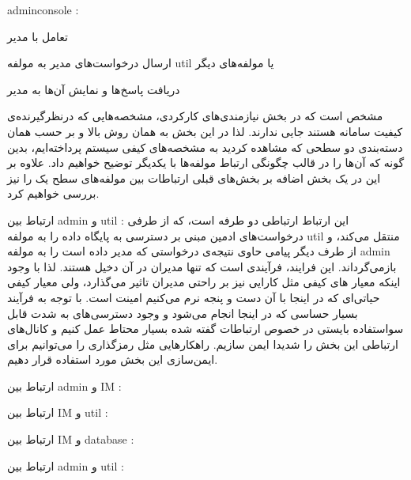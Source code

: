 \begin{itemize}	

	 adminconsole : 

	\begin{itemize}	

		 	تعامل با مدیر

			ارسال درخواست‌های مدیر به مولفه util	یا مولفه‌های دیگر

		  	دریافت پاسخ‌ها و نمایش آ‌ن‌ها به مدیر

		

	\end{itemize}

\end{itemize}	




مشخص است که در بخش نیازمندی‌های کارکردی، مشخصه‌هایی که درنظرگیرنده‌ی کیفیت سامانه هستند جایی ندارند. لذا در این بخش به همان روش بالا و بر حسب همان دسته‌بندی دو سطحی که مشاهده کردید به مشخصه‌های کیفی سیستم پرداخته‌ایم، بدین گونه که آن‌ها را در قالب چگونگی ارتباط مولفه‌ها با یکدیگر توضیح خواهیم داد. علاوه بر این در یک بخش اضافه بر بخش‌های قبلی ارتباطات بین مولفه‌های سطح یک را نیز بررسی خواهیم کرد.




\begin{itemize}	

		 ارتباط بین admin و util : این ارتباط ارتباطی دو طرفه است، که از طرفی درخواست‌های ادمین مبنی بر دسترسی به پایگاه داده را به مولفه util منتقل می‌کند، و از طرف دیگر پیامی حاوی نتیجه‌ی درخواستی که مدیر داده است را به مولفه admin بازمی‌گرداند. این فرایند، فرآیندی است که تنها مدیران در آن دخیل هستند. لذا با وجود اینکه معیار های کیفی مثل کارایی نیز بر راحتی مدیران تاثیر می‌گذارد، ولی معیار کیفی حیاتی‌ای که در اینجا با آن دست و پنجه نرم می‌کنیم امینت است. با توجه به فرآیند بسیار حساسی که در اینجا انجام می‌شود و وجود دسترسی‌های به شدت قابل سواستفاده بایستی در خصوص ارتباطات گفته شده بسیار محتاط عمل کنیم و کانال‌های ارتباطی این بخش را شدیدا ایمن سازیم. راهکارهایی مثل رمزگذاری را می‌توانیم برای ایمن‌سازی این بخش مورد استفاده قرار دهیم.

		 ارتباط بین admin و IM :

		 ارتباط بین IM و util :

		 ارتباط بین IM و database :

		 ارتباط بین admin و util :

		

\end{itemize}

